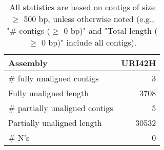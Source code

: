 \documentclass[12pt,a4paper]{article}
\begin{document}
\begin{table}[ht]
\begin{center}
\caption{All statistics are based on contigs of size $\geq$ 500 bp, unless otherwise noted (e.g., "\# contigs ($\geq$ 0 bp)" and "Total length ($\geq$ 0 bp)" include all contigs).}
\begin{tabular}{|l*{1}{|r}|}
\hline
Assembly & URI42H \\ \hline
\# fully unaligned contigs & 3 \\ \hline
Fully unaligned length & 3708 \\ \hline
\# partially unaligned contigs & 5 \\ \hline
Partially unaligned length & 30532 \\ \hline
\# N's & 0 \\ \hline
\end{tabular}
\end{center}
\end{table}
\end{document}
